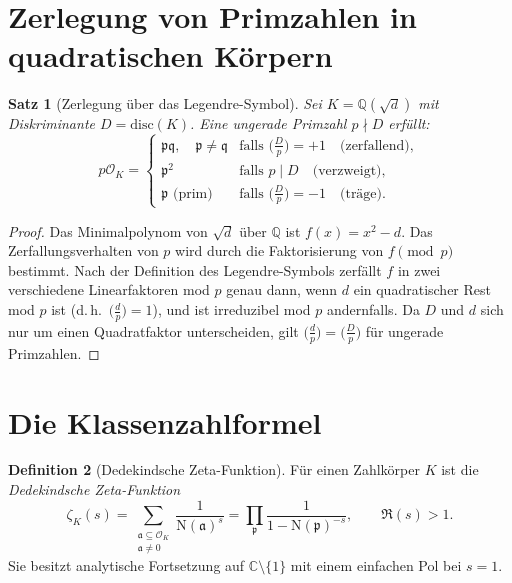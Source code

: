 \documentclass[12pt,a4paper]{amsart}
\newtheorem{theorem}{Satz}[section]
\theoremstyle{definition}
\newtheorem{definition}[theorem]{Definition}
\newcommand{\Q}{\mathbb{Q}}
\newcommand{\C}{\mathbb{C}}
\newcommand{\OK}{\mathcal{O}_K}
\newcommand{\p}{\mathfrak{p}}
\newcommand{\q}{\mathfrak{q}}
\newcommand{\aaa}{\mathfrak{a}}
\newcommand{\Nm}{\mathrm{N}}
\newcommand{\disc}{\mathrm{disc}}
\begin{document}
\section{Zerlegung von Primzahlen in quadratischen Körpern}

\begin{theorem}[Zerlegung über das Legendre-Symbol]
\label{thm:quad_zerlegung}
Sei $K = \Q(\sqrt{d})$ mit Diskriminante $D = \disc(K)$.
Eine ungerade Primzahl $p \nmid D$ erfüllt:
\[
  p\OK =
  \begin{cases}
    \p\q, \quad \p \ne \q & \text{falls } \bigl(\tfrac{D}{p}\bigr) = +1
    \quad\text{(zerfallend)}, \\[2pt]
    \p^2 & \text{falls } p \mid D
    \quad\text{(verzweigt)}, \\[2pt]
    \p \text{ (prim)} & \text{falls } \bigl(\tfrac{D}{p}\bigr) = -1
    \quad\text{(träge)}.
  \end{cases}
\]
\end{theorem}

\begin{proof}
Das Minimalpolynom von $\sqrt{d}$ über $\Q$ ist $f(x) = x^2 - d$.
Das Zerfallungsverhalten von $p$ wird durch die Faktorisierung von $f \pmod{p}$
bestimmt.  Nach der Definition des Legendre-Symbols zerfällt $f$ in zwei
verschiedene Linearfaktoren mod $p$ genau dann, wenn $d$ ein quadratischer
Rest mod $p$ ist (d.\,h.\ $\bigl(\tfrac{d}{p}\bigr) = 1$), und ist
irreduzibel mod $p$ andernfalls.  Da $D$ und $d$ sich nur um einen
Quadratfaktor unterscheiden, gilt $\bigl(\tfrac{d}{p}\bigr) = \bigl(\tfrac{D}{p}\bigr)$
für ungerade Primzahlen.
\end{proof}

\section{Die Klassenzahlformel}

\begin{definition}[Dedekindsche Zeta-Funktion]
\label{def:dedekind_zeta}
Für einen Zahlkörper $K$ ist die \emph{Dedekindsche Zeta-Funktion}
\[
  \zeta_K(s) = \sum_{\substack{\aaa \subseteq \OK \\ \aaa \ne 0}}
  \frac{1}{\Nm(\aaa)^s}
  = \prod_{\p} \frac{1}{1 - \Nm(\p)^{-s}}, \qquad \Re(s) > 1.
\]
Sie besitzt analytische Fortsetzung auf $\C \setminus \{1\}$ mit einem
einfachen Pol bei $s = 1$.
\end{definition}
\end{document}
